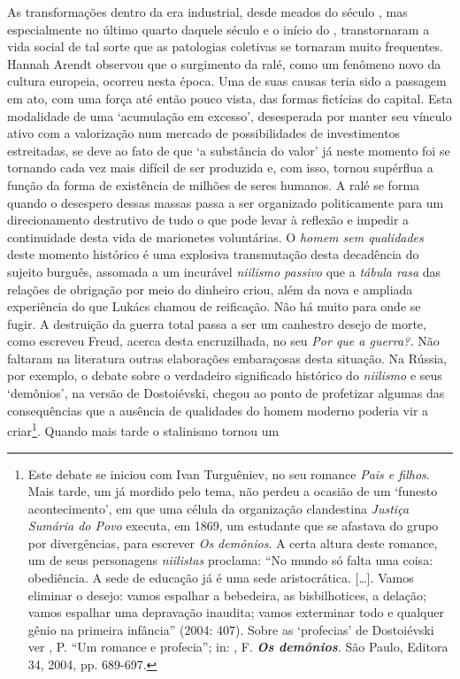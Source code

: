 As transformações dentro da era industrial, desde meados do século ,
mas especialmente no último quarto daquele século e o início do ,
transtornaram a vida social de tal sorte que as patologias coletivas se
tornaram muito frequentes. Hannah Arendt observou que o surgimento da
ralé, como um fenômeno novo da cultura europeia, ocorreu nesta época.
Uma de suas causas teria sido a passagem em ato, com uma força até então
pouco vista, das formas fictícias do capital. Esta modalidade de uma
`acumulação em excesso', desesperada por manter seu vínculo ativo com a
valorização num mercado de possibilidades de investimentos estreitadas,
se deve ao fato de que `a substância do valor' já neste momento foi se
tornando cada vez mais difícil de ser produzida e, com isso, tornou
supérflua a função da forma de existência de milhões de seres humanos. A
ralé se forma quando o desespero dessas massas passa a ser organizado
politicamente para um direcionamento destrutivo de tudo o que pode levar
à reflexão e impedir a continuidade desta vida de marionetes
voluntárias. O \emph{homem sem qualidades} deste momento histórico é uma
explosiva transmutação desta decadência do sujeito burguês, assomada a
um incurável \emph{niilismo passivo} que a \emph{tábula rasa} das
relações de obrigação por meio do dinheiro criou, além da nova e
ampliada experiência do que Lukács chamou de reificação. Não há muito
para onde se fugir. A destruição da guerra total passa a ser um
canhestro desejo de morte, como escreveu Freud, acerca desta
encruzilhada, no seu \emph{Por que a guerra?.} Não faltaram na
literatura outras elaborações embaraçosas desta situação. Na Rússia, por
exemplo, o debate sobre o verdadeiro significado histórico do
\emph{niilismo} e seus `demônios', na versão de Dostoiévski, chegou ao
ponto de profetizar algumas das consequências que a ausência de
qualidades do homem moderno poderia vir a criar\footnote{Este debate se
  iniciou com Ivan Turguêniev, no seu romance \emph{Pais e filhos}. Mais
  tarde, um  já mordido pelo tema, não perdeu a ocasião de um
  `funesto acontecimento', em que uma célula da organização clandestina
  \emph{Justiça Sumária do Povo} executa, em 1869, um estudante que se
  afastava do grupo por divergências, para escrever \emph{Os demônios}.
  A certa altura deste romance, um de seus personagens \emph{niilistas}
  proclama: ``No mundo só falta uma coisa: obediência. A sede de
  educação já é uma sede aristocrática. [\ldots{}]. Vamos eliminar o
  desejo: vamos espalhar a bebedeira, as bisbilhotices, a delação; vamos
  espalhar uma depravação inaudita; vamos exterminar todo e qualquer
  gênio na primeira infância'' (2004: 407). Sobre as `profecias' de
  Dostoiévski ver , P. ``Um romance e profecia''; in:
  , F. \emph{\textbf{Os demônios}.} São Paulo, Editora 34,
  2004, pp. 689-697.}. Quando mais tarde o stalinismo tornou um
